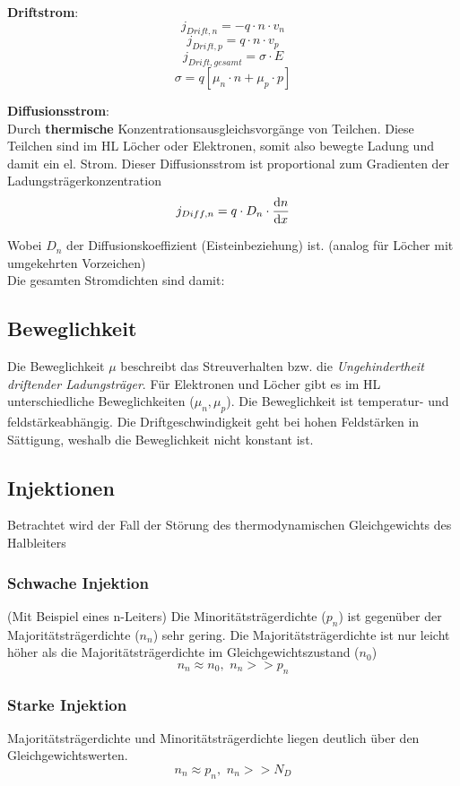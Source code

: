 \documentclass[a4paper, 12pt]{article}
\begin{document}
\textbf{Driftstrom}:
\[ j_{Drift, n} = -q \cdot n \cdot v_n\]
\[ j_{Drift, p} = q \cdot n \cdot v_p\]
\[ j_{Drift, gesamt} = \sigma \cdot E\]
\[\sigma = q [\mu_n\cdot n + \mu_p \cdot p]\]

\textbf{Diffusionsstrom}:\\
Durch \textbf{thermische} Konzentrationsausgleichsvorgänge von Teilchen. Diese
Teilchen sind im HL Löcher oder Elektronen, somit also bewegte Ladung und damit
ein el. Strom. Dieser Diffusionsstrom ist proportional zum Gradienten der Ladungsträgerkonzentration
\[ j_{Diff, n} = q \cdot D_n \cdot \frac{\mathop{}\!\mathrm{d} n}{\mathop{}\!\mathrm{d} x}\]

Wobei $D_n$ der Diffusionskoeffizient (Eisteinbeziehung) ist. (analog für Löcher
mit umgekehrten Vorzeichen)\\

Die gesamten Stromdichten sind damit:



\holine{\textwidth}

\subsection*{Beweglichkeit}
Die Beweglichkeit $\mu$ beschreibt das Streuverhalten bzw. die \emph{Ungehindertheit
driftender Ladungsträger}.
\notebox{
\[ v_D = \mu \cdot E \]
}
Für Elektronen und Löcher gibt es im HL unterschiedliche Beweglichkeiten
($\mu_n, \mu_p$). Die Beweglichkeit ist temperatur- und feldstärkeabhängig.
Die Driftgeschwindigkeit geht bei hohen Feldstärken in Sättigung, weshalb die
Beweglichkeit nicht konstant ist.

\subsection*{Injektionen}
Betrachtet wird der Fall der Störung des thermodynamischen Gleichgewichts des Halbleiters

\subsubsection*{Schwache Injektion}
(Mit Beispiel eines n-Leiters)
Die Minoritätsträgerdichte ($p_n$) ist gegenüber der Majoritätsträgerdichte
($n_n$) sehr gering. Die Majoritätsträgerdichte ist nur leicht höher als die
Majoritätsträgerdichte im Gleichgewichtszustand ($n_0$)
$$n_n \approx n_0,\,\, n_n > > p_n$$

\subsubsection*{Starke Injektion}
Majoritätsträgerdichte und Minoritätsträgerdichte liegen deutlich über den Gleichgewichtswerten.
$$n_n \approx p_n, \,\, n_n > > N_D$$
\end{document}
